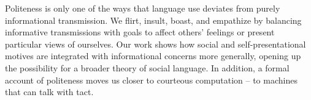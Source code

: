\documentclass[9pt,twocolumn,twoside,lineno]{main_class_file}
\begin{document}
Politeness is only one of the ways that language use deviates from purely
informational transmission.
We flirt, insult, boast, and empathize by balancing informative transmissions with goals to affect others' feelings or
present particular views of ourselves.
Our work shows how social and
self-presentational motives are integrated with informational concerns more
generally, opening up the possibility for a broader theory of social
language.
In addition, a formal account of politeness moves us closer to
courteous computation -- to machines that can talk with tact.

\end{document}
